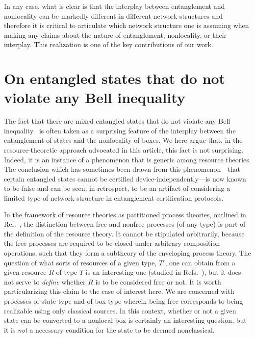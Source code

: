 \documentclass[12pt]{article}
\theoremstyle{plain}
\theoremstyle{definition}
\begin{document}
In any case, what is clear is that the  interplay between entanglement and nonlocality can be markedly different in different network structures and therefore it is critical to articulate which network structure one is assuming when making any claims about the nature of entanglement, nonlocality, or their interplay. 
This realization is one of the key contributions of our work.


\section{On entangled states that do not violate any Bell inequality}\label{Werner}


The fact that there are mixed entangled states that do not violate any Bell inequality~\cite{werner1989quantum,Barrettlocal}  is often taken as a surprising feature of the interplay between the entanglement of states and the nonlocality of boxes.  We here argue that, in the resource-theoretic approach advocated in this article, this fact is not surprising.  Indeed, it is an instance of a phenomenon that is generic among resource theories.  The conclusion which has sometimes been drawn from this phenomenon---that certain entangled states cannot be certified device-independently---is now known to be false and can be seen, in retrospect, to be an artifact of considering a limited type of 
network structure
in entanglement certification protocols. 



In the framework of resource theories as partitioned process theories, outlined in Ref.~\cite{coecke2016mathematical}, the distinction between free and nonfree processes (of any type) is part of the definition of the resource theory. It cannot be stipulated arbitrarily, because the free processes are required to be closed under arbitrary composition operations, such that they form a subtheory of the enveloping process theory.  The question of what sorts of resources of a given type, $T'$, one can obtain from a given resource $R$ of type $T$ is an interesting one (studied in Refs.~\cite{semiquantum,rosset2020characterizing}), but it does not serve to {\em define} whether $R$ is to be considered free or not.  
It is worth particularizing this claim to the case of interest here.  We are concerned with processes of state type and of box type wherein being free corresponds to being  realizable  using only classical sources.  In this context, whether or not a given state can be converted to a nonlocal box is certainly an interesting question, but it is {\em not} a necessary condition for the state to be deemed nonclassical. 
\end{document}
